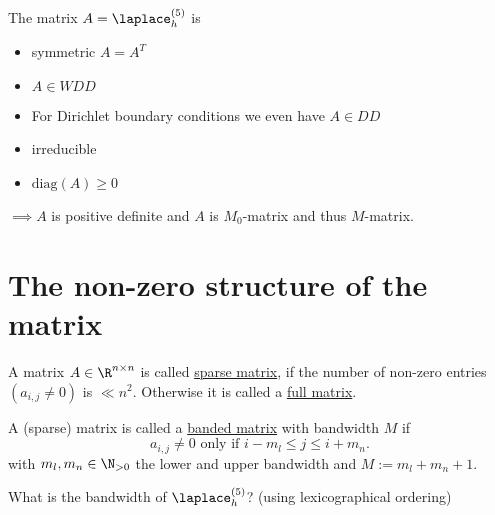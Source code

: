 \begin{summary}
\label{thm:summarymatrices}
The matrix $A = \laplace_{h}^{(5)}$ is 
\begin{itemize}
	\item symmetric $A = A^{T}$
	\item $A \in WDD$
	\item For Dirichlet boundary conditions we even have $A \in DD$
	\item irreducible
	\item $\text{diag}(A) \geq 0$
\end{itemize}
	$\implies A$ is positive definite and $A$ is $M_0$-matrix and thus $M$-matrix.
\end{summary}

\section{The non-zero structure of the matrix}%
\label{sec non-zero structure of the matrix}

A matrix $A \in \R^{n \times n}$ is called \underline{sparse matrix}, if the number of non-zero entries $(a_{i,j}\neq 0)$ is $\ll n^2$. Otherwise it is called a \underline{full matrix}. 

\begin{definition}
\label{thm:sparsetypes}
A (sparse) matrix is called a \underline{banded matrix}  with bandwidth $M$ if
\[
a_{i,j}\neq 0 \text{ only if } i-m_{l} \leq j \leq i + m_{n}
.\] 
with $m_{l},m_{n} \in \N_{>0}$ the lower and upper bandwidth and $M:=m_{l} + m_{n} + 1$.
\end{definition}

What is the bandwidth of $\laplace_{h}^{(5)}$? (using lexicographical ordering)

